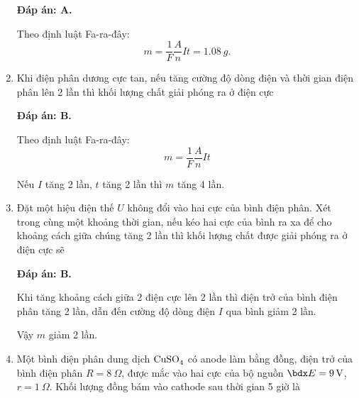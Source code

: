 \begin{enumerate}[label=\bfseries Câu \arabic*:]
{	}
	\loigiai
	{	\textbf{Đáp án: A.}
		
		Theo định luật Fa-ra-đây:
		$$m=\dfrac{1}{F} \dfrac{A}{n} It = \SI{1.08}{g}.$$
	}
	\item {}
	
	\cauhoi
	{Khi điện phân dương cực tan, nếu tăng cường độ dòng điện và thời gian điện phân lên 2 lần thì khối lượng chất giải phóng ra ở điện cực
		
	}
	\loigiai
	{	\textbf{Đáp án: B.}
		
		Theo định luật Fa-ra-đây:
		$$m=\dfrac{1}{F} \dfrac{A}{n} I t$$
		
		Nếu $I$ tăng 2 lần, $t$ tăng 2 lần thì $m$ tăng 4 lần.
	}
	\item {}
	
	\cauhoi
	{Đặt một hiệu điện thế $U$ không đổi vào hai cực của bình điện phân. Xét trong cùng một khoảng thời gian, nếu kéo hai cực của bình ra xa để cho khoảng cách giữa chúng tăng 2 lần thì khối lượng chất được giải phóng ra ở điện cực sẽ
		
	}
	\loigiai
	{	\textbf{Đáp án: B.}
		
		Khi tăng khoảng cách giữa 2 điện cực lên 2 lần thì điện trở của bình điện phân tăng 2 lần, dẫn đến cường độ dòng điện $I$ qua bình giảm 2 lần.
		
		Vậy $m$ giảm 2 lần.
	}
	\item {}
	
	\cauhoi
	{Một bình điện phân dung dịch $\ce{CuSO_4}$ có anode làm bằng đồng, điện trở của bình điện phân $R=\SI{8}{\Omega}$, được mắc vào hai cực của bộ nguồn $\calE = \SI{9}{V}$, $r=\SI{1}{\Omega}$. Khối lượng đồng bám vào cathode sau thời gian 5 giờ là
		
}
\end{enumerate}

